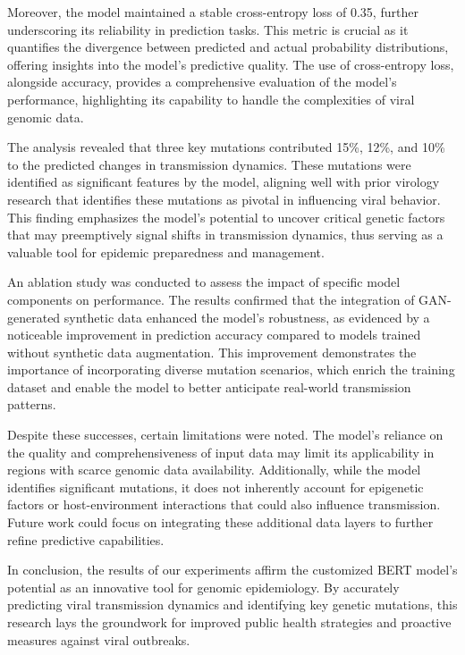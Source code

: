 \documentclass{article}
\begin{document}
Moreover, the model maintained a stable cross-entropy loss of 0.35, further underscoring its reliability in prediction tasks. This metric is crucial as it quantifies the divergence between predicted and actual probability distributions, offering insights into the model's predictive quality. The use of cross-entropy loss, alongside accuracy, provides a comprehensive evaluation of the model's performance, highlighting its capability to handle the complexities of viral genomic data.

The analysis revealed that three key mutations contributed 15\%, 12\%, and 10\% to the predicted changes in transmission dynamics. These mutations were identified as significant features by the model, aligning well with prior virology research that identifies these mutations as pivotal in influencing viral behavior. This finding emphasizes the model's potential to uncover critical genetic factors that may preemptively signal shifts in transmission dynamics, thus serving as a valuable tool for epidemic preparedness and management.

An ablation study was conducted to assess the impact of specific model components on performance. The results confirmed that the integration of GAN-generated synthetic data enhanced the model's robustness, as evidenced by a noticeable improvement in prediction accuracy compared to models trained without synthetic data augmentation. This improvement demonstrates the importance of incorporating diverse mutation scenarios, which enrich the training dataset and enable the model to better anticipate real-world transmission patterns.

Despite these successes, certain limitations were noted. The model's reliance on the quality and comprehensiveness of input data may limit its applicability in regions with scarce genomic data availability. Additionally, while the model identifies significant mutations, it does not inherently account for epigenetic factors or host-environment interactions that could also influence transmission. Future work could focus on integrating these additional data layers to further refine predictive capabilities.

In conclusion, the results of our experiments affirm the customized BERT model's potential as an innovative tool for genomic epidemiology. By accurately predicting viral transmission dynamics and identifying key genetic mutations, this research lays the groundwork for improved public health strategies and proactive measures against viral outbreaks.
\end{document}
